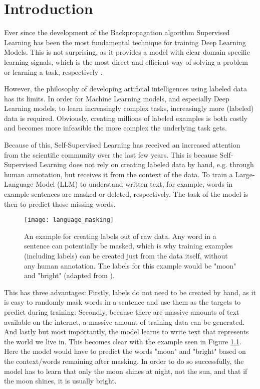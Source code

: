 \chapter{Introduction}
Ever since the development of the Backpropagation
algorithm Supervised Learning has been the most fundamental technique for
training Deep Learning Models. This is not surprising, as it provides a model with clear domain specific
learning signals, which is the most direct and efficient way of solving a problem
or learning a task, respectively \cite{geron}.

However, the philosophy of developing artificial intelligences using labeled
data has its limits. In order for Machine Learning models, and especially Deep Learning models, 
to learn increasingly complex tasks, increasingly more (labeled) data is required.
Obviously, creating millions of labeled examples is both costly and becomes more infeasible
the more complex the underlying task gets.

Because of this, Self-Supervised Learning has received an increased attention from the scientific
community over the last few years. This is because Self-Supervised Learning does not
rely on creating labeled data by hand, e.g. through human annotation, but receives it
from the context of the data. To train a Large-Language Model (LLM) to understand 
written text, for example, words in example sentences are masked or
deleted, respectively. The task of the model is then to predict those missing words.


\begin{figure}[htbp]
	\texttt{[image: language\_masking]}
	\centering
    \label{language_masking}
	\caption{An example for creating labels out of raw data. Any word in a sentence can
    potentially be masked, which is why training examples (including labels) can be created
    just from the data itself, without any human annotation. The labels for this example would
    be "moon" and "bright" (adapted from \cite{lecun}).}
\end{figure}

This has three advantages: Firstly, labels do not need to be created by hand, as it is easy
to randomly mask words in a sentence and use them as the targets to predict during training.
Secondly, because there are massive amounts of text available on the internet, a massive amount of training
data can be generated.
And lastly but most importantly, the model learns to write text that represents the world we live in.
This becomes clear with the example seen in Figure \ref{language_masking}.
Here the model would have to predict the words "moon" and "bright" based on the context/words
remaining after masking. In order to do so successfully, the model has to learn that only the moon shines at night, not the
sun, and that if the moon shines, it is usually bright.

